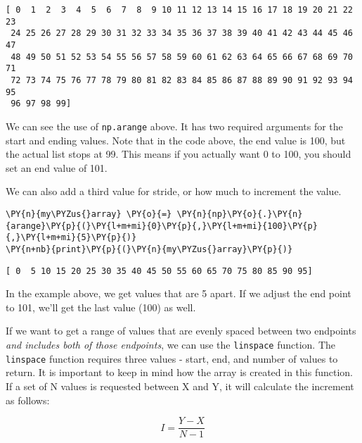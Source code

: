     \begin{Verbatim}[commandchars=\\\{\}]
[ 0  1  2  3  4  5  6  7  8  9 10 11 12 13 14 15 16 17 18 19 20 21 22 23
 24 25 26 27 28 29 30 31 32 33 34 35 36 37 38 39 40 41 42 43 44 45 46 47
 48 49 50 51 52 53 54 55 56 57 58 59 60 61 62 63 64 65 66 67 68 69 70 71
 72 73 74 75 76 77 78 79 80 81 82 83 84 85 86 87 88 89 90 91 92 93 94 95
 96 97 98 99]
    \end{Verbatim}

    We can see the use of \texttt{np.arange} above. It has two required
arguments for the start and ending values. Note that in the code above,
the end value is 100, but the actual list stops at 99. This means if you
actually want 0 to 100, you should set an end value of 101.

We can also add a third value for stride, or how much to increment the
value.

    \begin{tcolorbox}[breakable, size=fbox, boxrule=1pt, pad at break*=1mm,colback=cellbackground, colframe=cellborder]
\begin{Verbatim}[commandchars=\\\{\}]
\PY{n}{my\PYZus{}array} \PY{o}{=} \PY{n}{np}\PY{o}{.}\PY{n}{arange}\PY{p}{(}\PY{l+m+mi}{0}\PY{p}{,}\PY{l+m+mi}{100}\PY{p}{,}\PY{l+m+mi}{5}\PY{p}{)}
\PY{n+nb}{print}\PY{p}{(}\PY{n}{my\PYZus{}array}\PY{p}{)}
\end{Verbatim}
\end{tcolorbox}

    \begin{Verbatim}[commandchars=\\\{\}]
[ 0  5 10 15 20 25 30 35 40 45 50 55 60 65 70 75 80 85 90 95]
    \end{Verbatim}

    In the example above, we get values that are 5 apart. If we adjust the
end point to 101, we'll get the last value (100) as well.

If we want to get a range of values that are evenly spaced between two
endpoints \emph{and includes both of those endpoints}, we can use the
\texttt{linspace} function. The \texttt{linspace} function requires
three values - start, end, and number of values to return. It is
important to keep in mind how the array is created in this function. If
a set of N values is requested between X and Y, it will calculate the
increment as follows:

\[ I = \frac{Y-X}{N-1} \]

